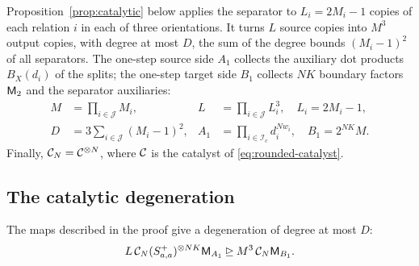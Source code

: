Proposition~\ref{prop:catalytic} below applies the separator to
\(L_i=2M_i-1\) copies of each relation \(i\) in each of three orientations.
It turns \(L\) source copies into \(M^3\) output copies, with degree at
most \(D\), the sum of the degree bounds \((M_i-1)^2\) of all separators.
The one-step source side \(A_1\) collects the auxiliary dot products
\(B_X(d_i)\) of the splits; the one-step target side \(B_1\) collects
\(NK\) boundary factors \(\mathsf M_2\) and the separator auxiliaries:
\begin{align}
 M&=\prod_{i\in\mathcal J}M_i,&
 L&=\prod_{i\in\mathcal J}L_i^3,\quad L_i=2M_i-1,
 \label{eq:copy-counts}\\
 D&=3\sum_{i\in\mathcal J}(M_i-1)^2,&
 A_1&=\prod_{i\in\mathcal I_c}d_i^{Nw_i},\quad
 B_1=2^{NK}M.
 \label{eq:dimensions}
\end{align}
Finally, \(\mathcal C_N=\mathcal C^{\otimes N}\), where \(\mathcal C\) is the catalyst of
\eqref{eq:rounded-catalyst}.

\subsection{The catalytic degeneration}
\label{subsec:catalytic}

\begin{proposition}\label{prop:catalytic}
The maps described in the proof give a degeneration of degree at most
\(D\):
\begin{equation}\label{eq:catalytic-degeneration}
 L\,\mathcal C_N(S^+_{a,a})^{\otimes NK}\mathsf M_{A_1}
 \unrhd M^3\,\mathcal C_N\mathsf M_{B_1}.
\end{equation}
\end{proposition}

